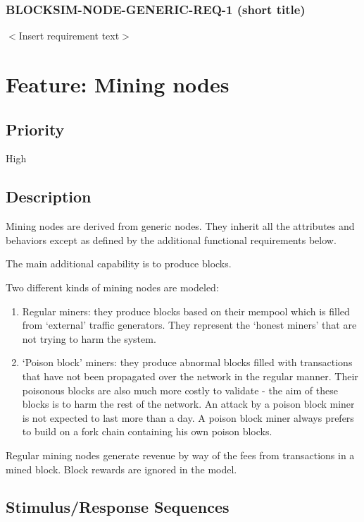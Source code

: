 \documentclass{scrreprt}
\begin{document}
\subsubsection{BLOCKSIM-NODE-GENERIC-REQ-1 (short title)}

$<$Insert requirement text$>$




\section{Feature: Mining nodes}

\subsection{Priority}

High

\subsection{Description}

Mining nodes are derived from generic nodes. They inherit all the
attributes and behaviors except as defined by the additional functional
requirements below.

The main additional capability is to produce blocks.

Two different kinds of mining nodes are modeled:

\begin{enumerate}
   \item Regular miners: they produce blocks based on their mempool which is filled from `external' traffic generators. They represent the `honest miners' that are not trying to harm the system.
   \item `Poison block' miners: they produce abnormal blocks filled with transactions that have not been propagated over the network in the regular manner. Their poisonous blocks are also much more costly to validate - the aim of these blocks is to harm the rest of the network. An attack by a poison block miner is not expected to last more than a day. A poison block miner always prefers to build on a fork chain containing his own poison blocks.
\end{enumerate}

Regular mining nodes generate revenue by way of the fees from transactions
in a mined block. Block rewards are ignored in the model.


\subsection{Stimulus/Response Sequences}
\end{document}

